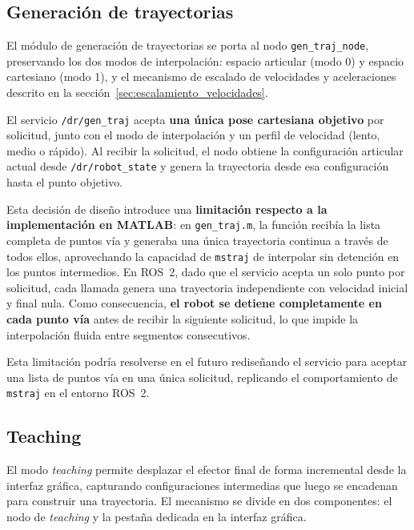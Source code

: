 \documentclass{article}
\begin{document}
\subsection{Generación de trayectorias}
\label{sec:ros2_trayectorias}

El módulo de generación de trayectorias se porta al nodo \texttt{gen\_traj\_node}, preservando los dos modos de interpolación: espacio articular (modo 0) y espacio cartesiano (modo 1), y el mecanismo de escalado de velocidades y aceleraciones descrito en la sección~\ref{sec:escalamiento_velocidades}.

El servicio \texttt{/dr/gen\_traj} acepta \textbf{una única pose cartesiana objetivo} por solicitud, junto con el modo de interpolación y un perfil de velocidad (lento, medio o rápido). Al recibir la solicitud, el nodo obtiene la configuración articular actual desde \texttt{/dr/robot\_state} y genera la trayectoria desde esa configuración hasta el punto objetivo.

Esta decisión de diseño introduce una \textbf{limitación respecto a la implementación en MATLAB}: en \texttt{gen\_traj.m}, la función recibía la lista completa de puntos vía y generaba una única trayectoria continua a través de todos ellos, aprovechando la capacidad de \texttt{mstraj} de interpolar sin detención en los puntos intermedios. En ROS~2, dado que el servicio acepta un solo punto por solicitud, cada llamada genera una trayectoria independiente con velocidad inicial y final nula. Como consecuencia, \textbf{el robot se detiene completamente en cada punto vía} antes de recibir la siguiente solicitud, lo que impide la interpolación fluida entre segmentos consecutivos.

Esta limitación podría resolverse en el futuro rediseñando el servicio para aceptar una lista de puntos vía en una única solicitud, replicando el comportamiento de \texttt{mstraj} en el entorno ROS~2.

\subsection{Teaching}
\label{sec:ros2_teaching}

El modo \textit{teaching} permite desplazar el efector final de forma incremental desde la interfaz gráfica, capturando configuraciones intermedias que luego se encadenan para construir una trayectoria. El mecanismo se divide en dos componentes: el nodo de \textit{teaching} y la pestaña dedicada en la interfaz gráfica.
\end{document}
